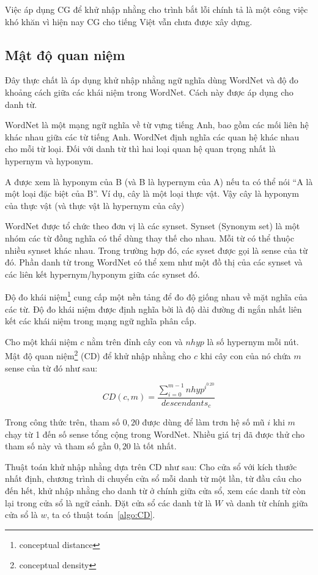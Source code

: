 \documentclass[a4paper,oneside,14pt]{extbook} %
\begin{document}


Việc áp dụng CG để khử nhập nhằng cho trình bắt lỗi chính tả là một
công việc khó khăn vì hiện nay CG cho tiếng Việt vẫn chưa được xây
dựng. 

\subsection{Mật độ quan niệm}


Đây thực chất là áp dụng khử nhập nhằng ngữ nghĩa dùng
WordNet và độ đo khoảng cách giữa các khái niệm trong WordNet. Cách
này được áp dụng cho danh từ. 

WordNet là một mạng ngữ nghĩa về từ vựng tiếng Anh, bao gồm các mối
liên hệ khác nhau giữa các từ tiếng Anh. WordNet định nghĩa các quan
hệ khác nhau cho mỗi từ loại. Đối với danh từ thì hai loại quan hệ
quan trọng nhất là hypernym và hyponym. 

A được xem là hyponym của B
(và B là hypernym của A) nếu ta có thể nói ``A là một loại đặc biệt
của B''. Ví dụ, cây là một loại thực vật. Vậy cây là hyponym của thực
vật (và thực vật là hypernym của cây)

WordNet được tổ chức theo đơn vị là các synset. Synset
(Synonym set) là một nhóm các từ đồng nghĩa có thể dùng thay thế cho
nhau. Mỗi từ có thể thuộc nhiều synset khác nhau. Trong trường hợp đó,
các syset được gọi là sense của từ đó. Phần danh từ trong WordNet có
thể xem như một đồ thị của các synset và các liên kết hypernym/hyponym
giữa các synset đó.  

Độ đo khái niệm\footnote{conceptual distance} cung cấp một nền tảng để
đo độ giống nhau về mặt nghĩa của các từ. Độ đo khái niệm được định
nghĩa bởi \cite{Rada} là độ dài đường đi ngắn nhất liên kết các khái
niệm trong mạng ngữ nghĩa phân cấp.

Cho một khái niệm $c$ nằm trên đỉnh cây con và $nhyp$ là số hypernym
mỗi nút. Mật độ quan niệm\footnote{conceptual density} (CD) để khử nhập nhằng cho $c$ khi cây con của
nó chứa $m$ sense của từ đó  như sau:

$$CD(c,m)=\frac{\displaystyle\sum^{m-1}_{i=0}nhyp^{i^{0.20}}}{descendants_c}$$

Trong công thức trên, tham số $0,20$ được dùng để làm trơn hệ số mũ
$i$ khi $m$ chạy từ 1 đến số sense tổng cộng trong WordNet. Nhiều giá
trị đã được thử cho tham số này và tham số gần $0,20$ là tốt nhất.


Thuật toán khử nhập nhằng dựa trên CD như sau: Cho cửa sổ với kích
thước nhất định, chương trình di chuyển cửa sổ mỗi 
danh từ một lần, từ đầu câu cho đến hết, khử nhập nhằng cho danh từ ở
chính giữa cửa sổ, xem các danh từ còn lại trong cửa sổ là ngữ
cảnh. Đặt cửa sổ các danh từ là $W$ và danh từ chính giữa cửa sổ là
$w$, ta có thuật toán~\ref{algo:CD}.
\end{document}

